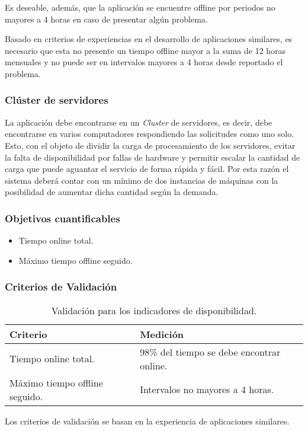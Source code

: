 Es deseable, además, que la aplicación se encuentre offline por periodos no mayores a 4 horas en caso de presentar algún problema.

Basado en criterios de experiencias en el desarrollo de aplicaciones similares, es necesario que esta no presente un tiempo offline mayor a la suma de 12 horas mensuales y no puede ser en intervalos mayores a 4 horas desde reportado el problema.

\subsubsection{Clúster de servidores}

La aplicación debe encontrarse en un \textit{Cluster} de servidores, es decir, debe encontrarse en varios computadores respondiendo las solicitudes como uno solo. Esto, con el objeto de dividir la carga de procesamiento de los servidores, evitar la falta de disponibilidad por fallas de hardware y permitir escalar la cantidad de carga que puede aguantar el servicio de forma rápida y fácil. Por esta razón el sistema deberá contar con un mínimo de dos instancias de máquinas con la posibilidad de aumentar dicha cantidad según la demanda.

\subsubsection{Objetivos cuantificables}

\begin{itemize}
	\item
	Tiempo online total.
	\item
	Máximo tiempo offline seguido.
\end{itemize}

\subsubsection{Criterios de Validación}

\begin{table}[H]
    \caption[Validación para los indicadores de disponibilidad.] {Validación para los indicadores de disponibilidad.}
    \label{tbl:Criterios de Validación disponibilidad}
    \begin{tabular}{|p{}|p{}|}
        \hline
        \textbf{Criterio} &  \textbf{Medición}\\
    	\hline
    	\hline
    	Tiempo online total.  & 98\% del tiempo se debe encontrar online.  \\ \hline
    	Máximo tiempo offline seguido.  & Intervalos no mayores a 4 horas.  \\ \hline
    \end{tabular}
\end{table}
Los criterios de validación se basan en la experiencia de aplicaciones similares.

